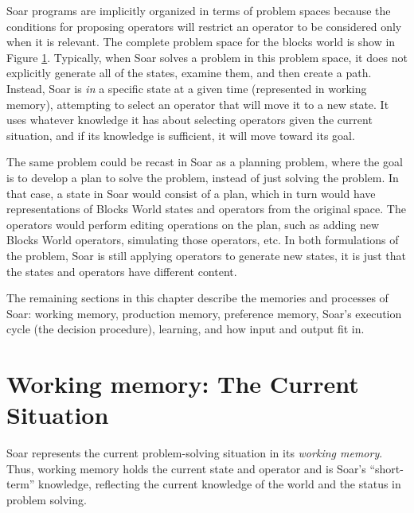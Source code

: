Soar programs are implicitly organized in terms of problem spaces
because the conditions for proposing operators will restrict an operator
to be considered only when it is relevant.  The complete problem space
for the blocks world is show in Figure \ref{fig:blocks-ps}.  Typically,
when Soar solves a problem in this problem space, it does not explicitly
generate all of the states, examine them, and then create a path.
Instead, Soar is \emph{in} a specific state at a given time (represented
in working memory), attempting to select an operator that will move it
to a new state.  It uses whatever knowledge it has about selecting
operators given the current situation, and if its knowledge is
sufficient, it will move toward its goal.
\begin{figure}
\label{fig:blocks-ps}
\end{figure}
The same problem could be recast in Soar as a planning problem, where
the goal is to develop a plan to solve the problem, instead of just
solving the problem.  In that case, a state in Soar would consist of a
plan, which in turn would have representations of Blocks World states
and operators from the original space.  The operators would perform
editing operations on the plan, such as adding new Blocks World
operators, simulating those operators, etc.  In both formulations of the
problem, Soar is still applying operators to generate new states, it is
just that the states and operators have different content.

The remaining sections in this chapter describe the memories and processes of Soar:
working memory, production memory, preference memory, Soar's execution cycle (the decision
procedure), learning, and how  input and output fit in.
\section{Working memory: The Current Situation} 
\label{ARCH-wm}

Soar represents the current problem-solving situation in its \emph{working
memory}. Thus, working memory holds the current state and operator and is Soar's
``short-term'' knowledge, reflecting the current knowledge of the world and
the status in problem solving.

